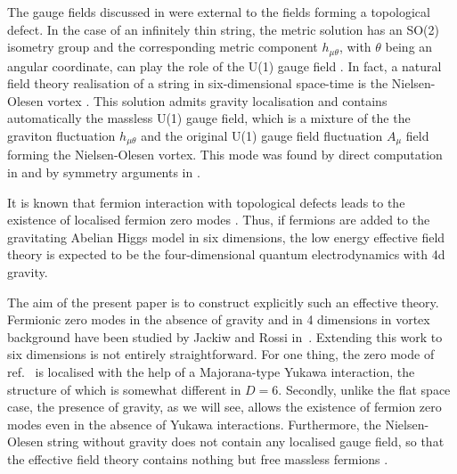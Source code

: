 \documentclass[a4paper,12pt]{article}
\begin{document}
The gauge fields discussed in \cite{Oda:2000zc,Dubovsky:2000av} were
external to the fields forming a topological defect. In the case of
an infinitely thin string, the metric solution has an SO(2) isometry
group and the corresponding metric component $h_{\mu\theta}$, with
$\theta$ being an angular coordinate, can play the role of the U(1)
gauge field \cite{Neronov:2001br}. In fact, a natural field theory
realisation of a string in six-dimensional space-time is the
Nielsen-Olesen  vortex \cite{Nielsen:qs}. This solution admits
gravity localisation \cite{Giovannini:2001hh} and contains
automatically the massless U(1) gauge field, which is  a mixture of
the the graviton  fluctuation $h_{\mu\theta}$ and the original U(1)
gauge field fluctuation $A_\mu$ field forming the Nielsen-Olesen
vortex.  This mode was found by direct computation in 
\cite{Giovannini:2002sb,Giovannini:2002mk} and by symmetry arguments
in \cite{Randjbar-Daemi:2002pq}. 

It is known that fermion interaction with topological defects leads
to the existence of localised fermion zero modes
\cite{Jackiw:1975fn,Jackiw:1981ee}. Thus, if fermions are added to
the gravitating Abelian Higgs model in six dimensions, the low energy
effective field theory is expected to be the four-dimensional quantum
electrodynamics with 4d gravity.

The aim of the present paper is to construct explicitly such an
effective theory. Fermionic zero modes in the absence of gravity and
in 4 dimensions in vortex background have been studied by Jackiw and
Rossi in~\cite{Jackiw:1981ee}. Extending this work to six dimensions
is not entirely straightforward. For one thing, the zero mode of
ref.~\cite{Jackiw:1981ee} is localised with the help of a
Majorana-type Yukawa interaction, the structure of which is somewhat
different in $D=6$. Secondly, unlike the flat space case, the
presence of gravity, as we will see, allows the existence of fermion
zero modes even in the absence of Yukawa interactions.  Furthermore,
the Nielsen-Olesen string without gravity does not contain any
localised gauge field, so that the effective field theory contains
nothing but free massless fermions \cite{Hughes:fa}. 
\end{document}
